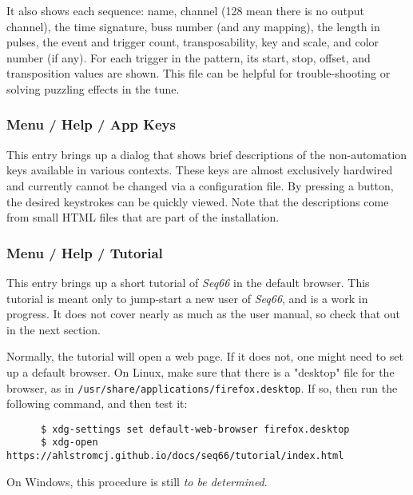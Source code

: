    It also shows each sequence: name, channel (128 mean there is no output
   channel), the time signature, buss number (and any mapping), the length in
   pulses, the event and trigger count, transposability, key and scale, and
   color number (if any).
   For each trigger in the pattern, its start, stop, offset, and transposition
   values are shown.
   This file can be helpful for trouble-shooting or solving puzzling effects in
   the tune.

\subsubsection{Menu / Help / App Keys}
\label{subsubsec:menu_help_app_keys}

   This entry brings up a dialog that shows brief descriptions of the
   non-automation keys available in various contexts.
   These keys are almost exclusively hardwired and currently cannot be
   changed via a configuration file.  By pressing a button, the desired
   keystrokes can be quickly viewed. Note that the descriptions come from small
   HTML files that are part of the installation.

\subsubsection{Menu / Help / Tutorial}
\label{subsubsec:menu_help_tutorial}

   This entry brings up a short tutorial of \textsl{Seq66} in the default
   browser. This tutorial is meant only to jump-start a new user of
   \textsl{Seq66}, and is a work in progress.
   It does not cover nearly as much as the user manual, so check that out in
   the next section.

   Normally, the tutorial will open a web page.  If it does not, one might need
   to set up a default browser.  On Linux, make sure that there is a "desktop"
   file for the browser, as in
   \texttt{/usr/share/applications/firefox.desktop}.
   If so, then run the following command, and then test it:

   \begin{verbatim}
      $ xdg-settings set default-web-browser firefox.desktop
      $ xdg-open https://ahlstromcj.github.io/docs/seq66/tutorial/index.html 
   \end{verbatim}

   On Windows, this procedure is still \textsl{to be determined}.

